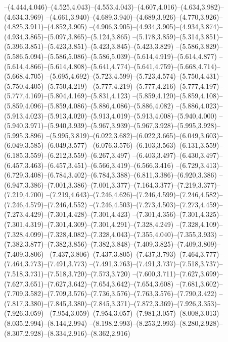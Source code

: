   --(4.444,4.046)--(4.525,4.043)--(4.553,4.043)--(4.607,4.016)--(4.634,3.982)--(4.634,3.969)%
  --(4.661,3.940)--(4.689,3.940)--(4.689,3.926)--(4.770,3.926)--(4.825,3.911)--(4.852,3.905)%
  --(4.906,3.905)--(4.934,3.905)--(4.934,3.874)--(4.934,3.865)--(5.097,3.865)--(5.124,3.865)%
  --(5.178,3.859)--(5.314,3.851)--(5.396,3.851)--(5.423,3.851)--(5.423,3.845)--(5.423,3.829)%
  --(5.586,3.829)--(5.586,5.094)--(5.586,5.086)--(5.586,5.039)--(5.614,4.919)--(5.614,4.877)%
  --(5.614,4.866)--(5.614,4.808)--(5.641,4.774)--(5.641,4.759)--(5.668,4.714)--(5.668,4.705)%
  --(5.695,4.692)--(5.723,4.599)--(5.723,4.574)--(5.750,4.431)--(5.750,4.405)--(5.750,4.219)%
  --(5.777,4.219)--(5.777,4.216)--(5.777,4.197)--(5.777,4.169)--(5.804,4.169)--(5.831,4.123)%
  --(5.859,4.120)--(5.859,4.108)--(5.859,4.096)--(5.859,4.086)--(5.886,4.086)--(5.886,4.082)%
  --(5.886,4.023)--(5.913,4.023)--(5.913,4.020)--(5.913,4.019)--(5.913,4.008)--(5.940,4.000)%
  --(5.940,3.971)--(5.940,3.939)--(5.967,3.939)--(5.967,3.928)--(5.995,3.928)--(5.995,3.896)%
  --(5.995,3.819)--(6.022,3.682)--(6.022,3.665)--(6.049,3.603)--(6.049,3.585)--(6.049,3.577)%
  --(6.076,3.576)--(6.103,3.563)--(6.131,3.559)--(6.185,3.559)--(6.212,3.559)--(6.267,3.497)%
  --(6.403,3.497)--(6.430,3.497)--(6.457,3.463)--(6.457,3.451)--(6.566,3.419)--(6.566,3.416)%
  --(6.729,3.413)--(6.729,3.408)--(6.784,3.402)--(6.784,3.388)--(6.811,3.386)--(6.920,3.386)%
  --(6.947,3.386)--(7.001,3.386)--(7.001,3.377)--(7.164,3.377)--(7.219,3.377)--(7.219,4.700)%
  --(7.219,4.643)--(7.246,4.626)--(7.246,4.599)--(7.246,4.582)--(7.246,4.579)--(7.246,4.552)%
  --(7.246,4.503)--(7.273,4.503)--(7.273,4.459)--(7.273,4.429)--(7.301,4.428)--(7.301,4.423)%
  --(7.301,4.356)--(7.301,4.325)--(7.301,4.319)--(7.301,4.309)--(7.301,4.291)--(7.328,4.249)%
  --(7.328,4.109)--(7.328,4.099)--(7.328,4.082)--(7.328,4.043)--(7.355,4.040)--(7.355,3.933)%
  --(7.382,3.877)--(7.382,3.856)--(7.382,3.848)--(7.409,3.825)--(7.409,3.809)--(7.409,3.806)%
  --(7.437,3.806)--(7.437,3.805)--(7.437,3.793)--(7.464,3.777)--(7.464,3.773)--(7.491,3.773)%
  --(7.491,3.763)--(7.491,3.737)--(7.518,3.737)--(7.518,3.731)--(7.518,3.720)--(7.573,3.720)%
  --(7.600,3.711)--(7.627,3.699)--(7.627,3.651)--(7.627,3.642)--(7.654,3.642)--(7.654,3.608)%
  --(7.681,3.602)--(7.709,3.582)--(7.709,3.576)--(7.736,3.576)--(7.763,3.576)--(7.790,3.422)%
  --(7.817,3.380)--(7.845,3.380)--(7.845,3.371)--(7.872,3.369)--(7.926,3.353)--(7.926,3.059)%
  --(7.954,3.059)--(7.954,3.057)--(7.981,3.057)--(8.008,3.013)--(8.035,2.994)--(8.144,2.994)%
  --(8.198,2.993)--(8.253,2.993)--(8.280,2.928)--(8.307,2.928)--(8.334,2.916)--(8.362,2.916)%
